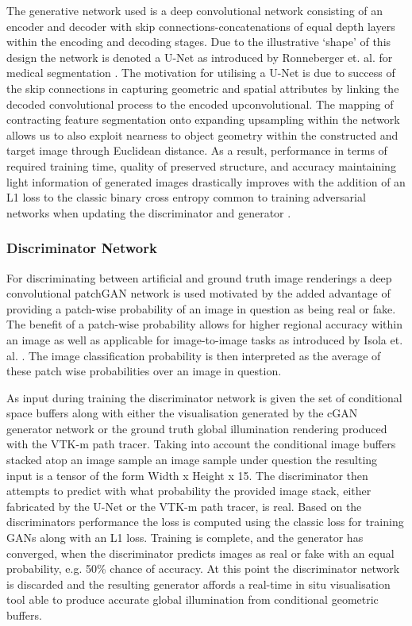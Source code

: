 The generative network used is a deep convolutional network consisting of an encoder and decoder with skip connections-concatenations of equal depth layers within the encoding and decoding stages. Due to the illustrative `shape' of this design the network is denoted a U-Net as introduced by Ronneberger et. al. for medical segmentation \cite{ronnebergerUnet}. The motivation for utilising a U-Net is due to success of the skip connections in capturing geometric and spatial attributes by linking the decoded convolutional process to the encoded upconvolutional. The mapping of contracting feature segmentation onto expanding upsampling within the network allows us to also exploit nearness to object geometry within the constructed and target image through Euclidean distance. As a result, performance in terms of required training time, quality of preserved structure, and accuracy maintaining light information of generated images drastically improves with the addition of an L1 loss to the classic binary cross entropy common to training adversarial networks when updating the discriminator and generator  \cite{isolaL1}\cite{goodfellowGAN}. 

\subsubsection{Discriminator Network}

For discriminating between artificial and ground truth image renderings a deep convolutional patchGAN network is used motivated by the added advantage of providing a patch-wise probability of an image in question as being real or fake. The benefit of a patch-wise probability allows for higher regional accuracy within an image as well as applicable for image-to-image tasks as introduced by Isola et. al. \cite{isolaPatch}. The image classification probability is then interpreted as the average of these patch wise probabilities over an image in question. 

As input during training the discriminator network is given the set of conditional space buffers along with either the visualisation generated by the cGAN generator network or the ground truth global illumination rendering produced with the VTK-m path tracer. Taking into account the conditional image buffers stacked atop an image sample an image sample under question the resulting input is a tensor of the form Width x Height x 15. The discriminator then attempts to predict with what probability the provided image stack, either fabricated by the U-Net or the VTK-m path tracer, is real. Based on the discriminators performance the loss is computed using the classic loss for training GANs along with an L1 loss. Training is complete, and the generator has converged, when the discriminator predicts images as real or fake with an equal probability, e.g. 50\% chance of accuracy. At this point the discriminator network is discarded and the resulting generator affords a real-time in situ visualisation tool able to produce accurate global illumination from conditional geometric buffers.
